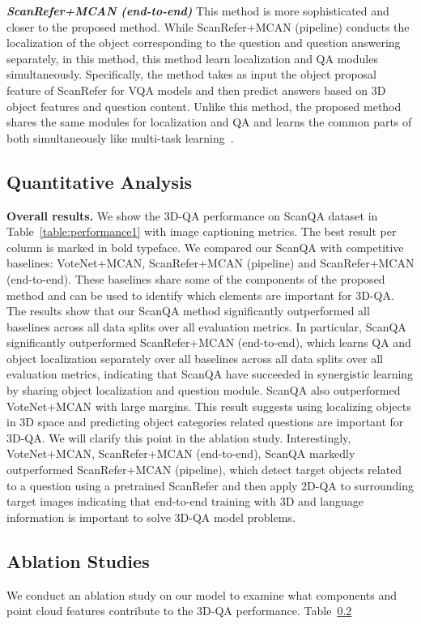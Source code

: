 \noindent \textit{\textbf{ScanRefer+MCAN (end-to-end)}}
This method is more sophisticated and closer to the proposed method.
While ScanRefer+MCAN (pipeline) conducts the localization of the object corresponding to the question and question answering separately, in this method, this method learn localization and QA modules simultaneously.
Specifically, the method takes as input the object proposal feature of ScanRefer for VQA models and then 
predict answers based on 3D object features and question content.
Unlike this method, the proposed method shares the same modules for localization and QA and learns the common parts of both simultaneously like multi-task learning~\cite{Zhan_2021_TKDE}.



\subsection{Quantitative Analysis}
\noindent \textbf{Overall results.} 
We show the 3D-QA performance on ScanQA dataset in Table~\ref{table:performance1} with image captioning metrics.
The best result per column is marked in bold typeface.
We compared our ScanQA with competitive baselines: VoteNet+MCAN, ScanRefer+MCAN (pipeline) and ScanRefer+MCAN (end-to-end).
These baselines share some of the components of the proposed method and can be used to identify which elements are important for 3D-QA.
The results show that our ScanQA method significantly outperformed all baselines across all data splits over all evaluation metrics. In particular, 
ScanQA significantly outperformed ScanRefer+MCAN (end-to-end), which learns QA and object localization separately over all baselines across all data splits over all evaluation metrics, indicating that ScanQA have succeeded in synergistic learning by sharing object localization and question module.
ScanQA also outperformed VoteNet+MCAN with large margins. This result suggests using localizing objects in 3D space and predicting object categories related questions are important for 3D-QA. We will clarify this point in the ablation study.
Interestingly, VoteNet+MCAN, ScanRefer+MCAN (end-to-end), ScanQA markedly outperformed ScanRefer+MCAN (pipeline), 
which detect target objects related to a question using a pretrained ScanRefer and then apply 2D-QA to surrounding target images indicating that end-to-end training with 3D and language information is important to solve 3D-QA model problems.



\subsection{Ablation Studies}
We conduct an ablation study on our model to examine what components and point cloud features contribute to the 3D-QA performance. Table~\ref{}

